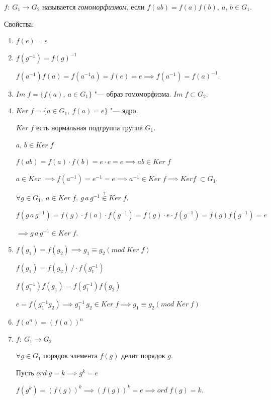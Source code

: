 \begin{definition}
  $f:~ G_1 \to G_2$ называется \textit{гомоморфизмом}, если $f(ab) = f(a)f(b),~ a,\,b \in G_1$.
\end{definition}
Свойства:
\begin{enumerate}
  \item $f(e) = e$
  \item $f(g^{-1}) = f(g)^{-1}$
  \begin{Proof}
    $f(a^{-1})f(a) = f(a^{-1}a) = f(e) = e \implies f(a^{-1}) = f(a)^{-1}$.
  \end{Proof}
  \item $Im\;f = \{f(a),~ a \in G_1\}$ "--- образ гомоморфизма. $Im\;f\subset G_2$.
  \item $Ker\;f = \{a \in G_1,~ f(a) = e\}$ "--- ядро.
  
  $Ker\;f$ есть нормальная подгруппа группа $G_1$.
  \begin{Proof}
    $a,\, b \in Ker\;f$

    $f(ab) = f(a) \cdot f(b) = e \cdot e = e \implies ab \in Ker\; f$

    $a \in Ker\; \implies f(a^{-1}) = e^{-1} = e \implies a^{-1} \in Ker\;f \implies Ker f\; \subset G_1$.

    $\forall g \in G_1,~a \in Ker\; f,~ g\,a\,g^{-1} \stackrel{?}{\in} Ker\;f$.

    $f(g\,a\,g^{-1}) = f(g)\cdot f(a)\cdot f(g^{-1}) = f(g)\cdot e \cdot f(g^{-1}) = f(g)f(g^{-1}) = e$
    
    $\implies g\,a\,g^{-1} \in Ker\;f$.
  \end{Proof}
  \item $f(g_1) = f(g_2) \implies g_1 \equiv g_2 (mod\; Ker\;f)$
  \begin{Proof}
    $f(g_1) = f(g_2) ~/ \cdot f(g_1^{-1})$

    $f(g_1^{-1}) f(g_1) = f(g_1^{-1})f(g_2)$

    $e = f(g_1^{-1}g_2) \implies g_1^{-1}\,g_2 \in Ker\;f \implies g_1 \equiv g_2 (mod\; Ker\;f)$
  \end{Proof}
  \item $f(a^n) = (f(a))^n$
  \item $f:~ G_1 \to G_2$
  
  $\forall g \in G_1$ порядок элемента $f(g)$ делит порядок $g$.
  \begin{Proof}
    Пусть $ord\; g = k \implies g^k = e$

    $f(g^k) =  (f(g))^k \implies (f(g))^k = e \implies ord\;f(g) = k$.
  \end{Proof}
\end{enumerate}